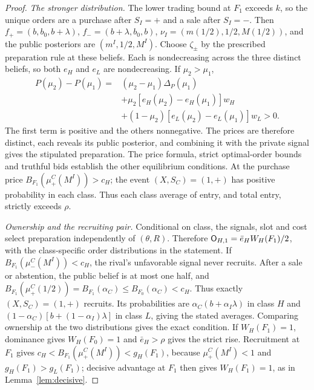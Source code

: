 \begin{proof}
\emph{The stronger distribution.} The lower trading bound at \(F_1\) exceeds \(k\), so the unique orders are a purchase
after \(S_I=+\) and a sale after \(S_I=-\). Then
\(f_+=(b,b_0,b+\lambda)\), \(f_-=(b+\lambda,b_0,b)\),
\(\nu_I=(m(1/2),1/2,M(1/2))\), and the public posteriors are \((m^I,1/2,M^I)\).
Choose \(\zeta_\pm\) by the prescribed preparation rule at these beliefs. Each is nondecreasing across the
three distinct beliefs, so both \(e_H\) and \(e_L\) are nondecreasing. If \(\mu_2>\mu_1\),
\[
\begin{aligned}
P(\mu_2)-P(\mu_1)
={}&(\mu_2-\mu_1)\Delta_P(\mu_1)\\
&+\mu_2[e_H(\mu_2)-e_H(\mu_1)]w_H\\
&+(1-\mu_2)[e_L(\mu_2)-e_L(\mu_1)]w_L>0.
\end{aligned}
\]
The first term is positive and the others nonnegative. The prices are therefore distinct, each reveals its
public posterior, and combining it with the private signal gives the stipulated preparation. The price formula,
strict optimal-order bounds and truthful bids establish the other equilibrium conditions.
At the purchase price \(B_{F_1}(\mu^C_+(M^I))>c_H\); the event \((X,S_C)=(1,+)\) has positive probability
in each class. Thus each class average of entry, and total entry, strictly exceeds \(\rho\).

\emph{Ownership and the recruiting pair.} Conditional on class, the signals, slot and cost select preparation
independently of \((\theta,R)\). Therefore
\(\mathsf{O}_{H,1}=\bar e_HW_H(F_1)/2\), with the class-specific order distributions in the statement.
If \(B_{F_1}(\mu^C_-(M^I))<c_H\), the rival's unfavorable signal never recruits.
After a sale or abstention, the public belief is at most one half, and
\(B_{F_1}(\mu^C_+(1/2))=B_{F_1}(\alpha_C)\le B_{F_0}(\alpha_C)<c_H\).
Thus exactly \((X,S_C)=(1,+)\) recruits. Its probabilities are
\(\alpha_C(b+\alpha_I\lambda)\) in class \(H\) and
\((1-\alpha_C)[b+(1-\alpha_I)\lambda]\) in class \(L\), giving the stated averages.
Comparing ownership at the two distributions gives the exact condition. If \(W_H(F_1)=1\), dominance gives
\(W_H(F_0)=1\) and \(\bar e_H>\rho\) gives the strict rise. Recruitment at \(F_1\) gives
\(c_H<B_{F_1}(\mu^C_+(M^I))<g_H(F_1)\), because \(\mu^C_+(M^I)<1\) and \(g_H(F_1)>g_L(F_1)\);
decisive advantage at \(F_1\) then gives \(W_H(F_1)=1\), as in Lemma~\ref{lem:decisive}.
\end{proof}

